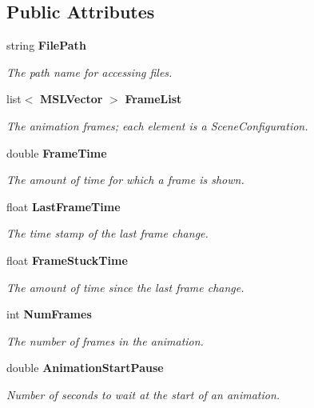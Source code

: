 \subsection*{Public Attributes}
\begin{CompactItemize}
\item 
string {\bf File\-Path}
\begin{CompactList}\small\item\em The path name for accessing files.\item\end{CompactList}\item 
list$<$ {\bf MSLVector} $>$ {\bf Frame\-List}
\begin{CompactList}\small\item\em The animation frames; each element is a Scene\-Configuration.\item\end{CompactList}\item 
double {\bf Frame\-Time}
\begin{CompactList}\small\item\em The amount of time for which a frame is shown.\item\end{CompactList}\item 
float {\bf Last\-Frame\-Time}
\begin{CompactList}\small\item\em The time stamp of the last frame change.\item\end{CompactList}\item 
float {\bf Frame\-Stuck\-Time}
\begin{CompactList}\small\item\em The amount of time since the last frame change.\item\end{CompactList}\item 
int {\bf Num\-Frames}
\begin{CompactList}\small\item\em The number of frames in the animation.\item\end{CompactList}\item 
double {\bf Animation\-Start\-Pause}
\begin{CompactList}\small\item\em Number of seconds to wait at the start of an animation.\item\end{CompactList}\item 

\end{CompactItemize}
